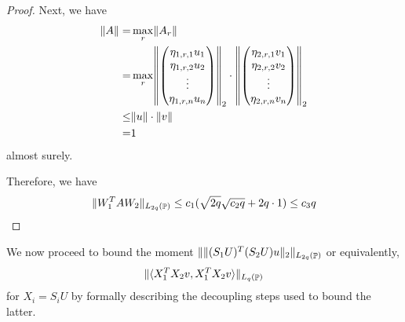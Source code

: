 \documentclass[11pt]{amsart}
\numberwithin{equation}{section}
\numberwithin{equation}{section}
\DeclareMathOperator{\Pb}{\mathbb{P}}
\DeclarePairedDelimiter{\norm}{\lVert}{\rVert}
\DeclarePairedDelimiter{\ip}{\langle}{\rangle}
\begin{document}
\begin{proof}
Next, we have
\begin{align*}
    \norm{A}=&\max \limits_{r} \norm{A_r}
    \\=&\max \limits_{r} \norm*{\begin{pmatrix} \eta_{1,r,1} u_1 \\ \eta_{1,r,2} u_2 \\ \vdots \\ \eta_{1,r,n} u_n \end{pmatrix}  }_2 \cdot \norm*{\begin{pmatrix} \eta_{2,r,1} v_1 \\ \eta_{2,r,2} v_2 \\ \vdots \\ \eta_{2,r,n} v_n \end{pmatrix}}_2
    \\ \le & \norm{u} \cdot \norm{v}
    \\=& 1
\end{align*}
almost surely.

Therefore, we have
\begin{align*}
    \norm{W_1^T A W_2}_{L_{2q}(\Pb)} \le c_1(\sqrt{2q} \sqrt{c_2q}+2q \cdot 1) \le c_3 q
\end{align*}


\end{proof}


We now proceed to bound the moment $\norm{\norm{(S_1 U)^T(S_2 U)u}_2}_{L_{2q}(\Pb)}$ or equivalently, \begin{align*}
    \norm{\ip{X_1^TX_2v,X_1^TX_2v}}_{L_{q}(\Pb)}
\end{align*} for $X_i = S_iU$ by formally describing the decoupling steps used to bound the latter.  
\end{document}
